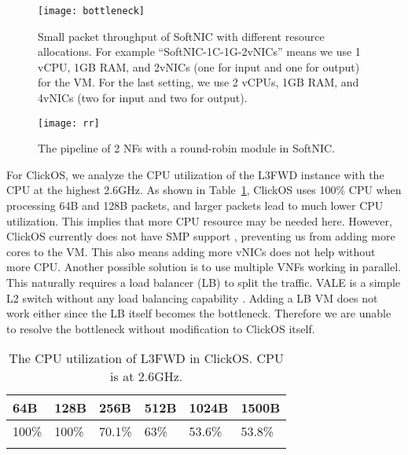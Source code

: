\begin{figure}[th!]
\centering
    \texttt{[image: bottleneck]}
     \caption{Small packet throughput of SoftNIC with different resource allocations. For example ``SoftNIC-1C-1G-2vNICs'' means we use 1 vCPU, 1GB RAM, and 2vNICs (one for input and one for output) for the VM. For the last setting, we use 2 vCPUs, 1GB RAM, and 4vNICs (two for input and two for output). }
    \label{fig:bottleneck}
\vspace{-3mm}
\end{figure}

\begin{figure}[ht]
\vspace{-2mm}
\centering
    \texttt{[image: rr]}
    \caption{The pipeline of 2 NFs with a round-robin module in SoftNIC. }
    \label{fig:rrtop}
    \vspace{-2mm}
\end{figure}



For {ClickOS}, we analyze the CPU utilization of the L3FWD instance with the CPU at the highest 2.6GHz. As shown in Table~\ref{cpu}, ClickOS uses 100\% CPU when processing 64B and 128B packets, and larger packets lead to much lower CPU utilization. This implies that more CPU resource may be needed here. However, ClickOS currently does not have SMP support \cite{MARO14}, preventing us from adding more cores to the VM. This also means adding more vNICs does not help without more CPU. Another possible solution is to use multiple VNFs working in parallel. This naturally requires a load balancer (LB) to split the traffic. VALE is a simple L2 switch without any load balancing capability \cite{rizzo2012vale}. Adding a LB VM does not work either since the LB itself becomes the bottleneck.
Therefore we are unable to resolve the bottleneck without modification to ClickOS itself. 



\begin{table}[h]
\centering
\small
\caption{The CPU utilization of L3FWD in ClickOS. CPU is at 2.6GHz. }
\label{cpu}
\begin{tabular}{llllll}
\hline
\multicolumn{1}{|l|}{64B}   & \multicolumn{1}{l|}{128B}  & \multicolumn{1}{l|}{256B}   & \multicolumn{1}{l|}{512B} & \multicolumn{1}{l|}{1024B}  & \multicolumn{1}{l|}{1500B}  \\ \hline
\multicolumn{1}{|l|}{100\%} & \multicolumn{1}{l|}{100\%} & \multicolumn{1}{l|}{70.1\%} & \multicolumn{1}{l|}{63\%} & \multicolumn{1}{l|}{53.6\%} & \multicolumn{1}{l|}{53.8\%} \\ \hline
                            &                            &                             &                           &                             &                          
\end{tabular}
\vspace{-6mm}
\end{table}

